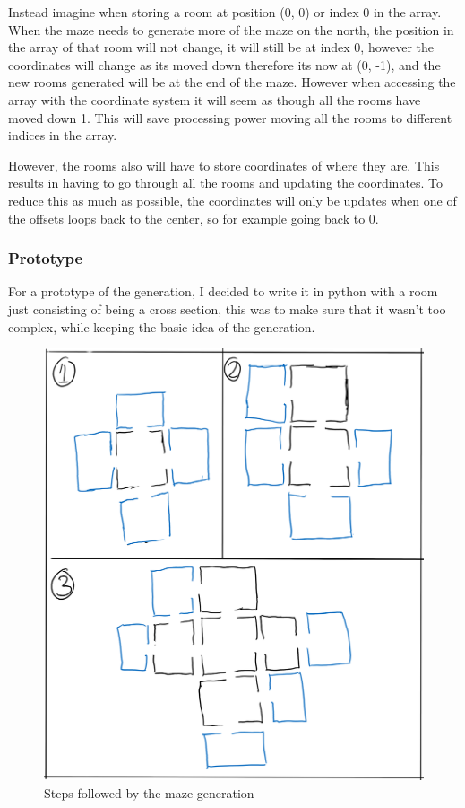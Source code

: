 \documentclass[../Main.tex]{subfiles}
\begin{document}
            Instead imagine when storing a room at position (0, 0) or index 0 in the array. When the maze needs to generate more of the maze on the north, the position in the array of that room will not change, it will still be at index 0, however the coordinates will change as its moved down therefore its now at (0, -1), and the new rooms generated will be at the end of the maze. However when accessing the array with the coordinate system it will seem as though all the rooms have moved down 1. This will save processing power moving all the rooms to different indices in the array.

            However, the rooms also will have to store coordinates of where they are. This results in having to go through all the rooms and updating the coordinates. To reduce this as much as possible, the coordinates will only be updates when one of the offsets loops back to the center, so for example going back to 0.
        \subsubsection{Prototype}
        For a prototype of the generation, I decided to write it in python with a room just consisting of being a cross section, this was to make sure that it wasn't too complex, while keeping the basic idea of the generation.
        \begin{figure}[hbt!]
            \centerline{\includegraphics[scale=0.5]{img/Design/Maze Generation.png}}
            \caption{Steps followed by the maze generation}
            \label{fig}
        \end{figure}
\end{document}
